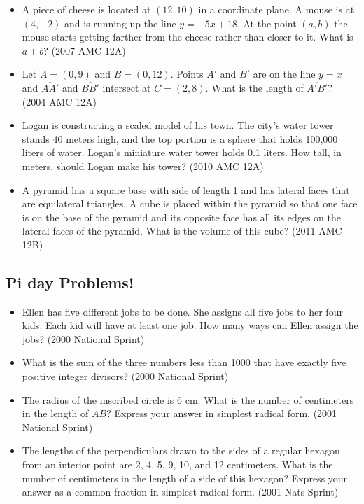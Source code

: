 \documentclass{article}
\begin{document}
\begin{itemize}
\begin{itemize}
\item A piece of cheese is located at $(12,10)$ in a coordinate plane. A mouse is at $(4,-2)$ and is running up the line $y=-5x+18$. At the point $(a,b)$ the mouse starts getting farther from the cheese rather than closer to it. What is $a+b$? (2007 AMC 12A)

\item Let $A=(0,9)$ and $B=(0,12)$. Points $A'$ and $B'$ are on the line $y=x$ and $\overline{AA'}$ and $\overline{BB'}$ intersect at $C=(2,8)$. What is the length of $\overline{A'B'}$? (2004 AMC 12A)

\item Logan is constructing a scaled model of his town. The city's water tower stands 40 meters high, and the top portion is a sphere that holds 100,000 liters of water. Logan's miniature water tower holds 0.1 liters. How tall, in meters, should Logan make his tower? (2010 AMC 12A)

\item A pyramid has a square base with side of length 1 and has lateral faces that are equilateral triangles. A cube is placed within the pyramid so that one face is on the base of the pyramid and its opposite face has all its edges on the lateral faces of the pyramid. What is the volume of this cube? (2011 AMC 12B)


\end{itemize}

\subsection{Pi day Problems!}
\begin{itemize}
\item Ellen has five different jobs to be done. She assigns all five jobs to her four kids. Each kid will have at least one job. How many ways can Ellen assign the jobs? (2000 National Sprint)

\item What is the sum of the three numbers less than 1000 that have exactly five positive integer divisors? (2000 National Sprint)

\item The radius of the inscribed circle is $6$ cm. What is the number of centimeters in the length of $\overline{AB}$? Express your answer in simplest radical form. (2001 National Sprint)

\item The lengths of the perpendiculars drawn to the sides of a regular hexagon from an interior point are 2, 4, 5, 9, 10, and 12 centimeters. What is the number of centimeters in the length of a side of this hexagon? Express your answer as a common fraction in simplest radical form. (2001 Nats Sprint)


\end{itemize}
\end{itemize}
\end{document}
